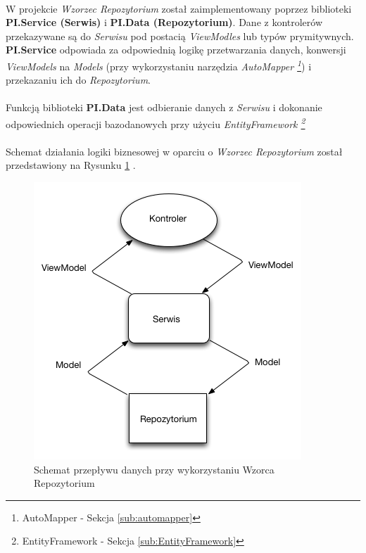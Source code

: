 \paragraph{} %
\label{par:}
W projekcie \textit{Wzorzec Repozytorium} został zaimplementowany poprzez biblioteki \textbf{PI.Service (Serwis)} i \textbf{PI.Data (Repozytorium)}.
Dane z kontrolerów przekazywane są do \textit{Serwisu} pod postacią \textit{ViewModles} lub typów prymitywnych. \textbf{PI.Service} odpowiada za odpowiednią logikę przetwarzania danych, konwersji \textit{ViewModels} na \textit{Models} (przy wykorzystaniu narzędzia \textit{AutoMapper \footnote{AutoMapper - Sekcja \ref{sub:automapper}}}) i przekazaniu ich do \textit{Repozytorium}.

\paragraph{} %
\label{par:}
Funkcją biblioteki \textbf{PI.Data} jest odbieranie danych z \textit{Serwisu} i dokonanie odpowiednich operacji bazodanowych przy użyciu \textit{EntityFramework \footnote{EntityFramework - Sekcja \ref{sub:EntityFramework}}}

\paragraph{} %
\label{par:}
Schemat działania logiki biznesowej w oparciu o \textit{Wzorzec Repozytorium} został przedstawiony na Rysunku \ref{fig:repository-pattern} .

\begin{figure}[ht]
	\centering
		\includegraphics[width=0.8\linewidth]{assets/repository_pattern.png}
	\caption{Schemat przepływu danych przy wykorzystaniu Wzorca Repozytorium}
	\label{fig:repository-pattern}
\end{figure}

